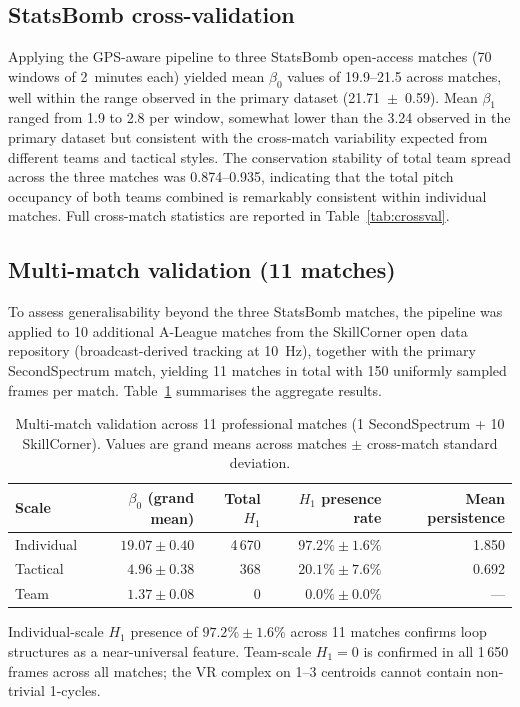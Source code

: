 \documentclass[11pt,a4paper]{article}
\begin{document}
\subsection{StatsBomb cross-validation}
\label{sec:statsbomb_results}

Applying the GPS-aware pipeline to three StatsBomb
open-access matches (70 windows of 2~minutes each) yielded
mean \(\beta_0\) values of 19.9--21.5 across matches, well
within the range observed in the primary dataset
(21.71~\(\pm\)~0.59).  Mean \(\beta_1\) ranged from 1.9 to
2.8 per window, somewhat lower than the 3.24 observed in
the primary dataset but consistent with the cross-match
variability expected from different teams and tactical
styles.  The conservation stability of total team spread
across the three matches was 0.874--0.935, indicating that
the total pitch occupancy of both teams combined is
remarkably consistent within individual matches.  Full
cross-match statistics are reported in
Table~\ref{tab:crossval}.

\subsection{Multi-match validation (11 matches)}
\label{sec:multivalidation}

To assess generalisability beyond the three StatsBomb matches,
the pipeline was applied to 10 additional A-League matches
from the SkillCorner open data repository (broadcast-derived
tracking at 10~Hz), together with the primary SecondSpectrum
match, yielding 11 matches in total with 150 uniformly sampled
frames per match.  Table~\ref{tab:multivalidation} summarises
the aggregate results.

\begin{table}[H]
\centering
\caption{Multi-match validation across 11 professional
  matches (1 SecondSpectrum + 10 SkillCorner).  Values are
  grand means across matches \(\pm\) cross-match standard
  deviation.}
\label{tab:multivalidation}
\begin{threeparttable}
\begin{tabular}{@{}lrrrr@{}}
\toprule
Scale      & \(\beta_0\) (grand mean) & Total \(H_1\) & \(H_1\) presence rate & Mean persistence \\
\midrule
Individual & \(19.07 \pm 0.40\) & 4\,670 & \(97.2\% \pm 1.6\%\) & 1.850 \\
Tactical   & \(4.96  \pm 0.38\) & 368    & \(20.1\% \pm 7.6\%\) & 0.692 \\
Team       & \(1.37  \pm 0.08\) & 0      & \(0.0\%  \pm 0.0\%\) & --- \\
\bottomrule
\end{tabular}
\begin{tablenotes}
\small
\item Individual-scale \(H_1\) presence of \(97.2\% \pm 1.6\%\)
  across 11 matches confirms loop structures as a near-universal
  feature.  Team-scale \(H_1 = 0\) is confirmed in all 1\,650
  frames across all matches; the VR complex on 1--3 centroids
  cannot contain non-trivial 1-cycles.
\end{tablenotes}
\end{threeparttable}
\end{table}
\end{document}
